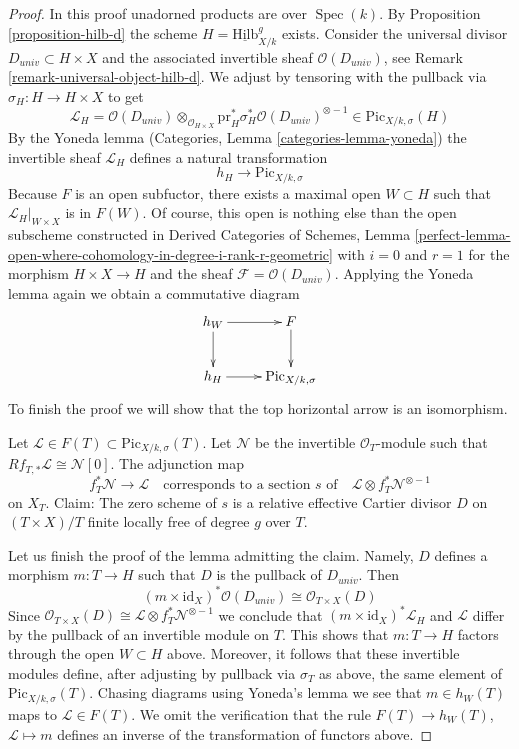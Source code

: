 \documentclass{stacks-project}
\theoremstyle{plain}
\theoremstyle{definition}
\theoremstyle{remark}
\numberwithin{equation}{subsection}
\def\Spec{\mathop{\mathrm{Spec}}}
\def\Hilbfunctor{\mathrm{Hilb}}
\def\Picardfunctor{\mathrm{Pic}}
\begin{document}
\begin{proof}
In this proof unadorned products are over $\Spec(k)$.
By Proposition \ref{proposition-hilb-d} the scheme
$H = \underline{\Hilbfunctor}^g_{X/k}$ exists.
Consider the universal divisor $D_{univ} \subset H \times X$
and the associated invertible sheaf $\mathcal{O}(D_{univ})$, see
Remark \ref{remark-universal-object-hilb-d}.
We adjust by tensoring with the pullback via
$\sigma_H : H \to H \times X$ to get
$$
\mathcal{L}_H =
\mathcal{O}(D_{univ})
\otimes_{\mathcal{O}_{H \times X}}
\text{pr}_H^*\sigma_H^*\mathcal{O}(D_{univ})^{\otimes -1}
\in
\Picardfunctor_{X/k, \sigma}(H)
$$
By the Yoneda lemma (Categories, Lemma \ref{categories-lemma-yoneda})
the invertible sheaf $\mathcal{L}_H$ defines a natural transformation
$$
h_H \longrightarrow \Picardfunctor_{X/k, \sigma}
$$
Because $F$ is an open subfuctor, there exists a maximal open
$W \subset H$ such that $\mathcal{L}_H|_{W \times X}$ is in
$F(W)$. Of course, this open is nothing else than the
open subscheme constructed in
Derived Categories of Schemes, Lemma
\ref{perfect-lemma-open-where-cohomology-in-degree-i-rank-r-geometric}
with $i = 0$ and $r = 1$ for the morphism $H \times X \to H$ and the sheaf
$\mathcal{F} = \mathcal{O}(D_{univ})$. Applying the Yoneda lemma
again we obtain a commutative diagram
$$
\xymatrix{
h_W \ar[d] \ar[r] & F \ar[d] \\
h_H \ar[r] & \Picardfunctor_{X/k, \sigma}
}
$$
To finish the proof we will show that the top horizontal arrow is an
isomorphism.

\medskip\noindent
Let $\mathcal{L} \in F(T) \subset \Picardfunctor_{X/k, \sigma}(T)$.
Let $\mathcal{N}$ be the invertible $\mathcal{O}_T$-module
such that $Rf_{T, *}\mathcal{L} \cong \mathcal{N}[0]$.
The adjunction map
$$
f_T^*\mathcal{N} \longrightarrow \mathcal{L}
\quad\text{corresponds to a section }s\text{ of}\quad
\mathcal{L} \otimes f_T^*\mathcal{N}^{\otimes -1}
$$
on $X_T$. Claim: The zero scheme of $s$ is a relative effective Cartier
divisor $D$ on $(T \times X)/T$ finite locally free of degree $g$ over $T$.

\medskip\noindent
Let us finish the proof of the lemma admitting the claim.
Namely, $D$ defines a morphism $m : T \to H$ such that $D$ is the pullback of
$D_{univ}$. Then
$$
(m \times \text{id}_X)^*\mathcal{O}(D_{univ}) \cong
\mathcal{O}_{T \times X}(D)
$$
Since $\mathcal{O}_{T \times X}(D) \cong
\mathcal{L} \otimes f_T^*\mathcal{N}^{\otimes -1}$
we conclude that $(m \times \text{id}_X)^*\mathcal{L}_H$ and $\mathcal{L}$
differ by the pullback of an invertible module on $T$.
This shows that $m : T \to H$ factors through the open $W \subset H$ above.
Moreover, it follows that these invertible modules define, after adjusting
by pullback via $\sigma_T$ as above, the same element of
$\Picardfunctor_{X/k, \sigma}(T)$. Chasing diagrams using Yoneda's lemma
we see that $m \in h_W(T)$ maps to $\mathcal{L} \in F(T)$. We omit
the verification that the rule $F(T) \to h_W(T)$,
$\mathcal{L} \mapsto m$ defines an inverse of the transformation
of functors above.


\end{proof}
\end{document}
